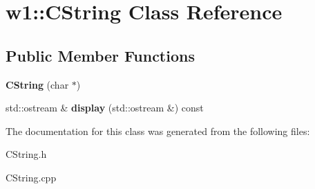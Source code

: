 \hypertarget{classw1_1_1CString}{}\section{w1\+:\+:C\+String Class Reference}
\label{classw1_1_1CString}
\subsection*{Public Member Functions}
\begin{DoxyCompactItemize}
\item 
\mbox{\label{classw1_1_1CString_a69bb541ea0685be4e37b2b3ded6246bd}} 
{\bfseries C\+String} (char $\ast$)
\item 
\mbox{\label{classw1_1_1CString_a8dbfd0386f585a68975a6eaa0e6bb0f4}} 
std\+::ostream \& {\bfseries display} (std\+::ostream \&) const
\end{DoxyCompactItemize}


The documentation for this class was generated from the following files\+:\begin{DoxyCompactItemize}
\item 
C\+String.\+h\item 
C\+String.\+cpp\end{DoxyCompactItemize}
